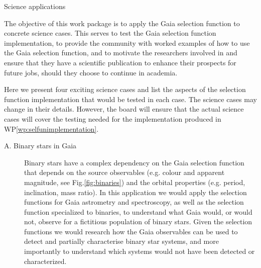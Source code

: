 \begin{workpackage}{Science applications}
  \label{wp:scienceappl}
  \wpend{\duration} %

  \makewptable %

  \begin{wpobjectives}
    The objective of this work package is to apply the Gaia selection function to concrete science cases. This serves to test the Gaia selection function implementation, to provide the community with worked examples of how to use the Gaia selection function, and to motivate the researchers involved in {\acro} and ensure that they have a scientific publication to enhance their prospects for future jobs, should they choose to continue in academia.
    
    Here we present four exciting science cases and list the aspects of the selection function implementation that would be tested in each case. The science cases may change in their details. However, the {\acro} board will ensure that the actual science cases will cover the testing needed for the implementation produced in WP\ref{wp:selfunimplementation}.
    
    \begin{description}
      \item[A. Binary stars in Gaia] {
        Binary stars have a complex dependency on the Gaia selection function that depends on the source observables (e.g. colour and apparent magnitude, see Fig.\ref{fig:binaries}) and the orbital properties (e.g. period, inclination, mass ratio). In this application we would apply the selection functions for Gaia astrometry and spectroscopy, as well as the selection function specialized to binaries, to understand what Gaia would, or would not, observe for a fictitious population of binary stars. Given the selection functions we would research how the Gaia observables can be used to detect and partially characterise binary star systems, and more importantly to understand which systems would not have been detected or characterized. 

}
\end{description}
\end{wpobjectives}
\end{workpackage}
